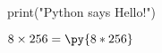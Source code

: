 \documentclass{article}
\newcommand{\pymultiply}[2]{\py{#1*#2}}
\begin{document}
\begin{pycode}
print("Python says Hello!")
\end{pycode}

\(8 \times 256 = \pymultiply{8}{256}\)
\end{document}
